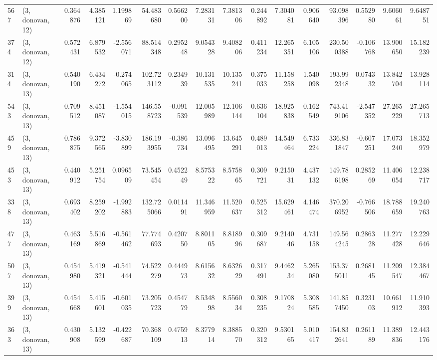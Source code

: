 \begin{tabular}{llrrrrrrrrrrrrrr}
567 &  (3, donovan, 12) &   0.364876 &   4.385121 &   1.199869 &    54.483680 &   0.566200 &   7.283131 &   7.381306 &  0.244892 &   7.304081 &   0.906640 &    93.098396 &  0.552980 &   9.606061 &   9.648751 \\
374 &  (3, donovan, 12) &   0.572431 &   6.879532 &  -2.556071 &    88.514348 &   0.295248 &   9.054328 &   9.408206 &  0.411234 &  12.265351 &   6.105106 &   230.500388 & -0.106768 &  13.900650 &  15.182239 \\
314 &  (3, donovan, 13) &   0.540190 &   6.434272 &  -0.274065 &   102.723112 &   0.234939 &  10.131535 &  10.135241 &  0.375033 &  11.158258 &   1.540098 &   193.992348 &  0.074332 &  13.842704 &  13.928114 \\
543 &  (3, donovan, 13) &   0.709512 &   8.451087 &  -1.554015 &   146.558723 &  -0.091539 &  12.005989 &  12.106144 &  0.636104 &  18.925838 &   0.162549 &   743.419106 & -2.547352 &  27.265229 &  27.265713 \\
459 &  (3, donovan, 13) &   0.786875 &   9.372565 &  -3.830899 &   186.193955 &  -0.386734 &  13.096495 &  13.645291 &  0.489013 &  14.549464 &   6.733224 &   336.831847 & -0.607251 &  17.073240 &  18.352979 \\
453 &  (3, donovan, 13) &   0.440912 &   5.251754 &   0.096509 &    73.545454 &   0.452249 &   8.575322 &   8.575865 &  0.309721 &   9.215031 &   4.437132 &   149.786198 &  0.285269 &  11.406054 &  12.238717 \\
338 &  (3, donovan, 13) &   0.693402 &   8.259202 &  -1.992883 &   132.725066 &   0.011491 &  11.346959 &  11.520637 &  0.525312 &  15.629461 &   4.146474 &   370.206952 & -0.766506 &  18.788659 &  19.240763 \\
477 &  (3, donovan, 13) &   0.463169 &   5.516869 &  -0.561462 &    77.774693 &   0.420750 &   8.801105 &   8.818996 &  0.309687 &   9.214046 &   4.731158 &   149.564245 &  0.286328 &  11.277428 &  12.229646 \\
507 &  (3, donovan, 13) &   0.454980 &   5.419321 &  -0.541444 &    74.522279 &   0.444973 &   8.615632 &   8.632629 &  0.317491 &   9.446234 &   5.265080 &   153.375011 &  0.268145 &  11.209547 &  12.384467 \\
399 &  (3, donovan, 13) &   0.454668 &   5.415601 &  -0.601035 &    73.205723 &   0.454779 &   8.534898 &   8.556034 &  0.308235 &   9.170824 &   5.308585 &   141.857450 &  0.323103 &  10.661912 &  11.910393 \\
363 &  (3, donovan, 13) &   0.430908 &   5.132599 &  -0.422687 &    70.368109 &   0.475913 &   8.377914 &   8.388570 &  0.320312 &   9.530165 &   5.010417 &   154.832641 &  0.261189 &  11.389836 &  12.443176 \\

\end{tabular}
